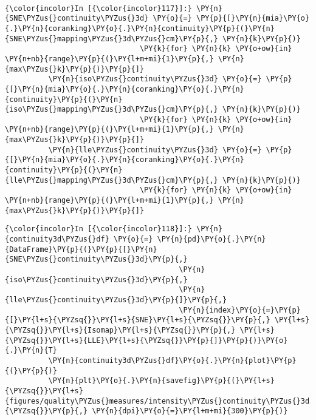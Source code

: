     \begin{center}
    \end{center}
    { \hspace*{\fill} \\}

    \begin{Verbatim}[commandchars=\\\{\}]
{\color{incolor}In [{\color{incolor}117}]:} \PY{n}{SNE\PYZus{}continuity\PYZus{}3d} \PY{o}{=} \PY{p}{[}\PY{n}{mia}\PY{o}{.}\PY{n}{coranking}\PY{o}{.}\PY{n}{continuity}\PY{p}{(}\PY{n}{SNE\PYZus{}mapping\PYZus{}3d\PYZus{}cm}\PY{p}{,} \PY{n}{k}\PY{p}{)}
                               \PY{k}{for} \PY{n}{k} \PY{o+ow}{in} \PY{n+nb}{range}\PY{p}{(}\PY{l+m+mi}{1}\PY{p}{,} \PY{n}{max\PYZus{}k}\PY{p}{)}\PY{p}{]}
          \PY{n}{iso\PYZus{}continuity\PYZus{}3d} \PY{o}{=} \PY{p}{[}\PY{n}{mia}\PY{o}{.}\PY{n}{coranking}\PY{o}{.}\PY{n}{continuity}\PY{p}{(}\PY{n}{iso\PYZus{}mapping\PYZus{}3d\PYZus{}cm}\PY{p}{,} \PY{n}{k}\PY{p}{)}
                               \PY{k}{for} \PY{n}{k} \PY{o+ow}{in} \PY{n+nb}{range}\PY{p}{(}\PY{l+m+mi}{1}\PY{p}{,} \PY{n}{max\PYZus{}k}\PY{p}{)}\PY{p}{]}
          \PY{n}{lle\PYZus{}continuity\PYZus{}3d} \PY{o}{=} \PY{p}{[}\PY{n}{mia}\PY{o}{.}\PY{n}{coranking}\PY{o}{.}\PY{n}{continuity}\PY{p}{(}\PY{n}{lle\PYZus{}mapping\PYZus{}3d\PYZus{}cm}\PY{p}{,} \PY{n}{k}\PY{p}{)}
                               \PY{k}{for} \PY{n}{k} \PY{o+ow}{in} \PY{n+nb}{range}\PY{p}{(}\PY{l+m+mi}{1}\PY{p}{,} \PY{n}{max\PYZus{}k}\PY{p}{)}\PY{p}{]}
\end{Verbatim}

    \begin{Verbatim}[commandchars=\\\{\}]
{\color{incolor}In [{\color{incolor}118}]:} \PY{n}{continuity3d\PYZus{}df} \PY{o}{=} \PY{n}{pd}\PY{o}{.}\PY{n}{DataFrame}\PY{p}{(}\PY{p}{[}\PY{n}{SNE\PYZus{}continuity\PYZus{}3d}\PY{p}{,}
                                        \PY{n}{iso\PYZus{}continuity\PYZus{}3d}\PY{p}{,}
                                        \PY{n}{lle\PYZus{}continuity\PYZus{}3d}\PY{p}{]}\PY{p}{,}
                                        \PY{n}{index}\PY{o}{=}\PY{p}{[}\PY{l+s}{\PYZsq{}}\PY{l+s}{SNE}\PY{l+s}{\PYZsq{}}\PY{p}{,} \PY{l+s}{\PYZsq{}}\PY{l+s}{Isomap}\PY{l+s}{\PYZsq{}}\PY{p}{,} \PY{l+s}{\PYZsq{}}\PY{l+s}{LLE}\PY{l+s}{\PYZsq{}}\PY{p}{]}\PY{p}{)}\PY{o}{.}\PY{n}{T}
          \PY{n}{continuity3d\PYZus{}df}\PY{o}{.}\PY{n}{plot}\PY{p}{(}\PY{p}{)}
          \PY{n}{plt}\PY{o}{.}\PY{n}{savefig}\PY{p}{(}\PY{l+s}{\PYZsq{}}\PY{l+s}{figures/quality\PYZus{}measures/intensity\PYZus{}continuity\PYZus{}3d.png}\PY{l+s}{\PYZsq{}}\PY{p}{,} \PY{n}{dpi}\PY{o}{=}\PY{l+m+mi}{300}\PY{p}{)}
\end{Verbatim}

